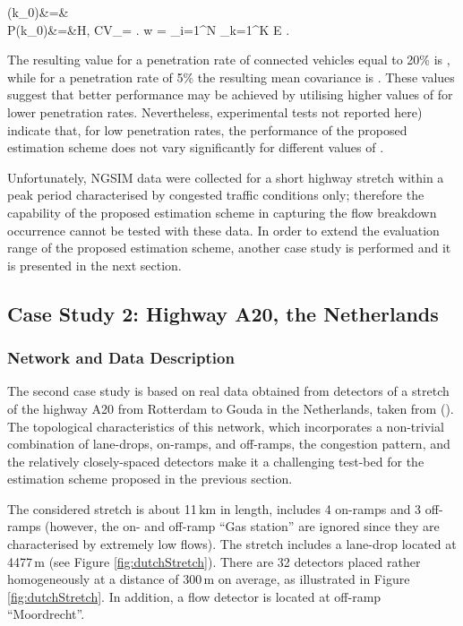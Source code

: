 \documentclass[titlepage,oneside,fleqn,12pt]{article}
\newcommand{\trbnum}[1]{{\it \citenum{#1}}}
\begin{document}
(k_0)&=&\mu\\
{P}(k_0)&=&H,\label{1234}
 \label{eq:perfIndexDens}
CV_\rho = .
 \label{covar}
w =  \sum_{i=1}^N \sum_{k=1}^K  \; E  .

The resulting value for a penetration rate of connected vehicles equal to 20\% is , while for a penetration rate of 5\% the resulting mean covariance is . These values suggest that better performance may be achieved by utilising higher values of  for lower penetration rates. Nevertheless, experimental tests not reported here) indicate that, for low penetration rates, the performance of the proposed estimation scheme does not vary significantly for different values of .

Unfortunately, NGSIM data were collected for a short highway stretch within a peak period characterised by congested traffic conditions only; therefore the capability of the proposed estimation scheme in capturing the flow breakdown occurrence cannot be tested with these data. In order to extend the evaluation range of the proposed estimation scheme, another case study is performed and it is presented in the next section.

\subsection{Case Study 2: Highway A20, the Netherlands}

\subsubsection{Network and Data Description}

The second case study is based on real data obtained from detectors of a stretch of the highway A20 from Rotterdam to Gouda in the Netherlands, taken from (\trbnum{Schakel2014}). The topological characteristics of this network, which incorporates a non-trivial combination of lane-drops, on-ramps, and off-ramps, the congestion pattern, and the relatively closely-spaced detectors make it a challenging test-bed for the estimation scheme proposed in the previous section.

The considered stretch is about 11\,km in length, includes 4 on-ramps and 3 off-ramps (however, the on- and off-ramp ``Gas station'' are ignored since they are characterised by extremely low flows). The stretch includes a lane-drop located at 4477\,m (see Figure \ref{fig:dutchStretch}). There are 32 detectors placed rather homogeneously at a distance of 300\,m on average, as illustrated in Figure \ref{fig:dutchStretch}. In addition, a flow detector is located at off-ramp ``Moordrecht''.
\end{document}
